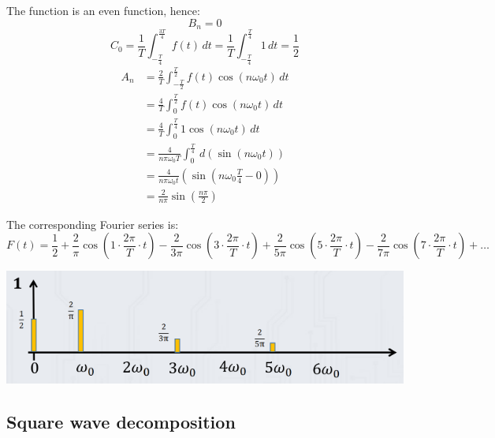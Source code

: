 \documentclass[11pt]{article}
\begin{document}
The function is an even function, hence:
\[B_n = 0\]
\[C_0 = \frac{1}{T} \int_{-\frac{T}{4}}^{\frac{3T}{4}} f(t) \, dt = \frac{1}{T} \int_{-\frac{T}{4}}^{\frac{T}{4}} 1 \, dt = \frac{1}{2}\]
\begin{align*}
A_n &= \frac{2}{T} \int_{-\frac{T}{2}}^{\frac{T}{2}} f(t) \cos (n \omega_0 t) \, dt \\
&= \frac{4}{T} \int_0^{\frac{T}{2}} f(t) \cos (n \omega_0 t) \, dt \\
&= \frac{4}{T} \int_0^{\frac{T}{4}} 1 \cos (n \omega_0 t) \, dt \\
&= \frac{4}{n \pi \omega_0 T} \int_0^{\frac{T}{4}} \, d(\sin (n \omega_0 t)) \\
&= \frac{4}{n \pi \omega_0 t} \left(\sin (n \omega_0 \frac{T}{4} - 0) \right) \\
&= \frac{2}{n \pi} \sin \left(\frac{n \pi}{2} \right)
\end{align*}

The corresponding Fourier series is:
\[F(t) = \frac{1}{2} + \frac{2}{\pi} \cos \left(1 \cdot \frac{2 \pi}{T} \cdot t \right) - \frac{2}{3 \pi} \cos \left( 3 \cdot \frac{2 \pi}{T} \cdot t \right) + \frac{2}{5 \pi} \cos \left( 5 \cdot \frac{2 \pi}{T} \cdot t \right) - \frac{2}{7 \pi} \cos \left( 7 \cdot \frac{2 \pi}{T} \cdot t \right) + \ldots\]

\begin{center}
\includegraphics[width=.9\linewidth]{./images/caculation-of-the-fourier-series-frequency-spectrum-result.png}
\end{center}

 \newpage
\subsection{Square wave decomposition}
\label{sec:org2ff9701}
\end{document}
